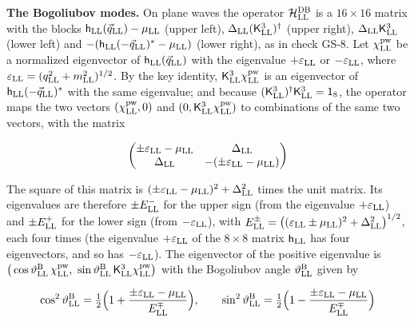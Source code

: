 \documentclass[
  10pt,
]{article}
\begin{document}
\textbf{The Bogoliubov modes.} On plane waves the operator
\(\mathcal H^{\rm DB}_{\rm LL}\) is a \(16\times16\) matrix with the
blocks \(\mathsf h_{\rm LL}(\vec q_{\rm LL})-\mu_{\rm LL}\) (upper
left), \(\Delta_{\rm LL}(\mathsf K^3_{\rm LL})^\dagger\) (upper right),
\(\Delta_{\rm LL}\mathsf K^3_{\rm LL}\) (lower left) and
\(-(\mathsf h_{\rm LL}(-\vec q_{\rm LL})^{*}-\mu_{\rm LL})\) (lower
right), as in check GS-8. Let \(\chi^{\rm pw}_{\rm LL}\) be a normalized
eigenvector of \(\mathsf h_{\rm LL}(\vec q_{\rm LL})\) with the
eigenvalue \(+\varepsilon_{\rm LL}\) or \(-\varepsilon_{\rm LL}\), where
\(\varepsilon_{\rm LL}=(q_{\rm LL}^2+m_{\rm LL}^2)^{1/2}\). By the key
identity, \(\mathsf K^3_{\rm LL}\chi^{\rm pw}_{\rm LL}\) is an
eigenvector of \(\mathsf h_{\rm LL}(-\vec q_{\rm LL})^{*}\) with the
same eigenvalue; and because
\((\mathsf K^3_{\rm LL})^\dagger\mathsf K^3_{\rm LL}=\mathsf 1_8\), the
operator maps the two vectors \((\chi^{\rm pw}_{\rm LL},0)\) and
\((0,\mathsf K^3_{\rm LL}\chi^{\rm pw}_{\rm LL})\) to combinations of
the same two vectors, with the matrix

\[\begin{pmatrix}\pm\varepsilon_{\rm LL}-\mu_{\rm LL}&\Delta_{\rm LL}\\\Delta_{\rm LL}&-(\pm\varepsilon_{\rm LL}-\mu_{\rm LL})\end{pmatrix}\]

The square of this matrix is
\((\pm\varepsilon_{\rm LL}-\mu_{\rm LL})^2+\Delta_{\rm LL}^2\) times the
unit matrix. Its eigenvalues are therefore \(\pm E^-_{\rm LL}\) for the
upper sign (from the eigenvalue \(+\varepsilon_{\rm LL}\)) and
\(\pm E^+_{\rm LL}\) for the lower sign (from
\(-\varepsilon_{\rm LL}\)), with
\(E^\pm_{\rm LL}=\big((\varepsilon_{\rm LL}\pm\mu_{\rm LL})^2+\Delta_{\rm LL}^2\big)^{1/2}\),
each four times (the eigenvalue \(+\varepsilon_{\rm LL}\) of the
\(8\times8\) matrix \(\mathsf h_{\rm LL}\) has four eigenvectors, and so
has \(-\varepsilon_{\rm LL}\)). The eigenvector of the positive
eigenvalue is
\(\big(\cos\vartheta^{\rm B}_{\rm LL}\,\chi^{\rm pw}_{\rm LL},\ \sin\vartheta^{\rm B}_{\rm LL}\,\mathsf K^3_{\rm LL}\chi^{\rm pw}_{\rm LL}\big)\)
with the Bogoliubov angle \(\vartheta^{\rm B}_{\rm LL}\) given by

\[\cos^2\vartheta^{\rm B}_{\rm LL}=\tfrac12\Big(1+\frac{\pm\varepsilon_{\rm LL}-\mu_{\rm LL}}{E^\mp_{\rm LL}}\Big),\qquad\sin^2\vartheta^{\rm B}_{\rm LL}=\tfrac12\Big(1-\frac{\pm\varepsilon_{\rm LL}-\mu_{\rm LL}}{E^\mp_{\rm LL}}\Big)\]
\end{document}
